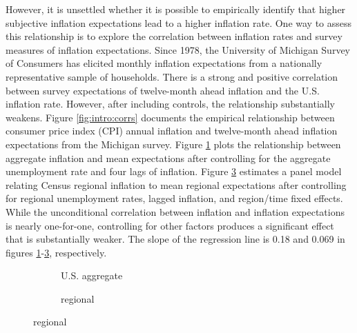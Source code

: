 \documentclass[12pt]{article}
\begin{document}
However, it is unsettled whether it is possible to empirically identify that higher subjective inflation expectations lead to a higher inflation rate. One way to assess this relationship is to explore the correlation between inflation rates and survey measures of inflation expectations. Since 1978, the University of Michigan Survey of Consumers has elicited monthly inflation expectations from a nationally representative sample of households. There is a strong and positive correlation between survey expectations of twelve-month ahead inflation and the U.S. inflation rate. However, after including controls, the relationship substantially weakens. Figure \ref{fig:intro:corrs} documents the empirical relationship between consumer price index (CPI) annual inflation and twelve-month ahead inflation expectations from the Michigan survey. Figure \ref{subfig:intro:us} plots the relationship between aggregate inflation and mean expectations after controlling for the aggregate unemployment rate and four lags of inflation. Figure \ref{subfig:intro:reg} estimates a panel model relating Census regional inflation to mean regional expectations after controlling for regional unemployment rates, lagged inflation, and region/time fixed effects. While the unconditional correlation between inflation and inflation expectations is nearly one-for-one, controlling for other factors produces a significant effect that is substantially weaker. The slope of the regression line is 0.18 and 0.069 in figures \ref{subfig:intro:us}-\ref{subfig:intro:reg}, respectively.\begin{figure}
\centering
\caption{Inflation and inflation expectations}\label{fig:intro:corrs}
\begin{subfigure}[t]{0.45\textwidth}
\centering

\caption{U.S. aggregate}\label{subfig:intro:us}
\end{subfigure}
\hfill
\begin{subfigure}[t]{0.45\textwidth}
\centering

\caption{regional}\label{subfig:intro:reg}
\end{subfigure}
\end{figure}
\end{document}
